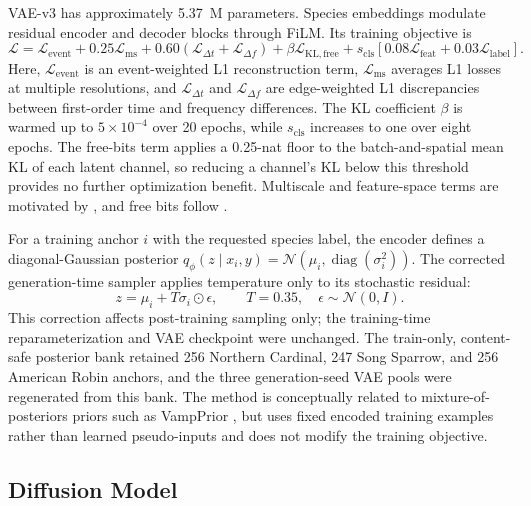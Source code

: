 \documentclass{article}
\begin{document}
VAE-v3 has approximately 5.37~M parameters. Species embeddings modulate
residual encoder and decoder blocks through FiLM. Its training objective is
\begin{equation}
\mathcal{L}
=
\mathcal{L}_{\mathrm{event}}
+0.25\mathcal{L}_{\mathrm{ms}}
+0.60\left(
    \mathcal{L}_{\Delta t}
    +\mathcal{L}_{\Delta f}
\right)
+\beta\mathcal{L}_{\mathrm{KL,free}}
+s_{\mathrm{cls}}
\left[
    0.08\mathcal{L}_{\mathrm{feat}}
    +0.03\mathcal{L}_{\mathrm{label}}
\right].
\label{eq:vae-loss}
\end{equation}
Here, $\mathcal{L}_{\mathrm{event}}$ is an event-weighted L1 reconstruction
term, $\mathcal{L}_{\mathrm{ms}}$ averages L1 losses at multiple resolutions,
and $\mathcal{L}_{\Delta t}$ and $\mathcal{L}_{\Delta f}$ are edge-weighted L1
discrepancies between first-order time and frequency differences. The KL
coefficient $\beta$ is warmed up to
$5\times10^{-4}$ over 20 epochs, while $s_{\mathrm{cls}}$ increases to one
over eight epochs. The free-bits term applies a 0.25-nat floor to the
batch-and-spatial mean KL of each latent channel, so reducing a channel's KL
below this threshold provides no further optimization benefit. Multiscale and
feature-space terms are motivated by
\cite{mathieu2016multiscale,johnson2016perceptual}, and free bits follow
\cite{kingma2016iaf}.

For a training anchor $i$ with the requested species label, the encoder defines
a diagonal-Gaussian posterior
$q_\phi(z\mid x_i,y)=
\mathcal{N}(\mu_i,\operatorname{diag}(\sigma_i^2))$.
The corrected generation-time sampler applies temperature only to its
stochastic residual:
\begin{equation}
z = \mu_i+T\sigma_i\odot\epsilon,
\qquad
T=0.35,\quad \epsilon\sim\mathcal{N}(0,I).
\label{eq:vae-anchor-sampling}
\end{equation}
This correction affects post-training sampling only; the training-time
reparameterization and VAE checkpoint were unchanged. The train-only,
content-safe posterior bank retained 256 Northern Cardinal, 247 Song Sparrow,
and 256 American Robin anchors, and the three generation-seed VAE pools were
regenerated from this bank. The method is conceptually related to
mixture-of-posteriors priors such as VampPrior \cite{tomczak2018vampprior},
but uses fixed encoded training examples rather than learned pseudo-inputs and
does not modify the training objective. 

\subsection{Diffusion Model}
\end{document}
